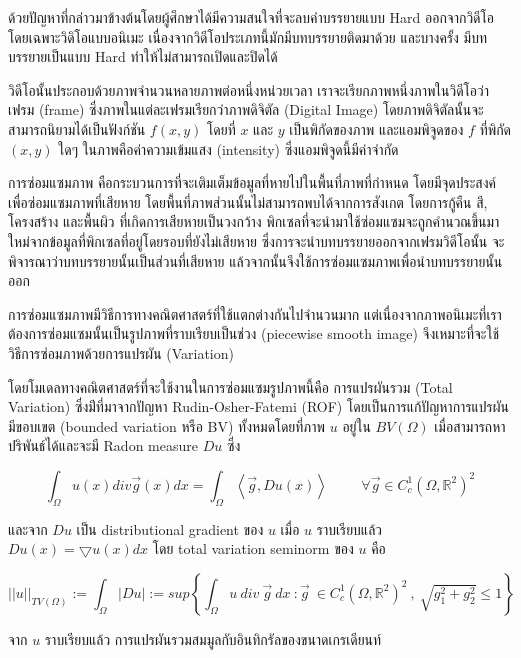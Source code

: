 \documentclass[hidelinks,a4paper,14pt]{article}
\numberwithin{equation}{section}							%
\begin{document}
{	ด้วยปัญหาที่กล่าวมาข้างต้นโดยผู้ศึกษาได้มีความสนใจที่จะลบคำบรรยายแบบ Hard ออกจากวิดีโอ โดยเฉพาะวิดิโอแบบอนิเมะ เนื่องจากวิดีโอประเภทนี้มักมีบทบรรยายติดมาด้วย และบางครั้ง มีบทบรรยายเป็นแบบ Hard ทำให้ไม่สามารถเปิดและปิดได้ \newline
	
	วิดีโอนั้นประกอบด้วยภาพจำนวนหลายภาพต่อหนึ่งหน่วยเวลา เราจะเรียกภาพหนึ่งภาพในวิดีโอว่า เฟรม (frame) ซึ่งภาพในแต่ละเฟรมเรียกว่าภาพดิจิตัล (Digital Image) โดยภาพดิจิตัลนั้นจะสามารถนิยามได้เป็นฟังก์ชัน $f(x,y)$ โดยที่ $x$ และ $y$ เป็นพิกัดของภาพ และแอมพิจูดของ $f$ ที่พิกัด $(x,y)$ ใดๆ ในภาพคือค่าความเข้มแสง (intensity)  ซึ่งแอมพิจูดนี้มีค่าจำกัด\newline
	
	การซ่อมแซมภาพ คือกระบวนการที่จะเติมเต็มข้อมูลที่หายไปในพื้นที่ภาพที่กำหนด โดยมีจุดประสงค์เพื่อซ่อมแซมภาพที่เสียหาย โดยพื้นที่ภาพส่วนนั้นไม่สามารถพบได้จากการสังเกต โดยการกู้คืน สี, โครงสร้าง และพื้นผิว ที่เกิดการเสียหายเป็นวงกว้าง พิกเซลที่จะนำมาใช้ซ่อมแซมจะถูกคำนวณขึ้นมาใหม่จากข้อมูลที่พิกเซลที่อยู่โดยรอบที่ยังไม่เสียหาย ซึ่งการจะนำบทบรรยายออกจากเฟรมวิดีโอนั้น จะพิจารณาว่าบทบรรยายนั้นเป็นส่วนที่เสียหาย แล้วจากนั้นจึงใช้การซ่อมแซมภาพเพื่อนำบทบรรยายนั้นออก\newline
	
	การซ่อมแซมภาพมีวิธีการทางคณิตศาสตร์ที่ใช้แตกต่างกันไปจำนวนมาก แต่เนื่องจากภาพอนิเมะที่เราต้องการซ่อมแซมนั้นเป็นรูปภาพที่ราบเรียบเป็นช่วง (piecewise smooth image) จึงเหมาะที่จะใช้วิธีการซ่อมภาพด้วยการแปรผัน (Variation) 
	
	โดยโมเดลทางคณิตศาสตร์ที่จะใช้งานในการซ่อมแซมรูปภาพนี้คือ การแปรผันรวม (Total Variation)  ซึ่งม่ีที่มาจากปัญหา Rudin-Osher-Fatemi (ROF) โดยเป็นการแก้ปัญหาการแปรผันมีขอบเขต (bounded variation หรือ BV) ทั้งหมดโดยที่ภาพ $u$ อยู่ใน $BV(\Omega)$ เมื่อสามารถหาปริพันธ์ได้และจะมี Radon measure $Du$ ซึ่ง 
	
	$$\int_{\Omega}u(x) div \vec{g}(x) dx = \int_{\Omega} \left\langle\vec{g},Du(x) \right\rangle\hspace{1cm}\forall\vec{g} \in C_c^1(\Omega,\mathbb{R}^2)^2$$
	
	และจาก $Du$ เป็น distributional gradient ของ $u$ เมื่อ $u$ ราบเรียบแล้ว  $Du(x)= \bigtriangledown u(x)dx $
	โดย total variation seminorm ของ $u$ คือ 
	
	$$ ||u||_{TV(\Omega)} := \int_{\Omega} | Du | := sup{ \left \{ \int_{\Omega}  u \ div  \ \vec{g} \ dx \  : \vec{g} \  \in C_c^1(\Omega,\mathbb{R}^2)^2 \ , \ \sqrt{g_1^2+g_2^2} \leq 1 \right \} }  $$
	
	จาก $u$ ราบเรียบแล้ว การแปรผันรวมสมมูลกับอินทิกรัลของขนาดเกรเดียนท์ 
	
}
\end{document}
